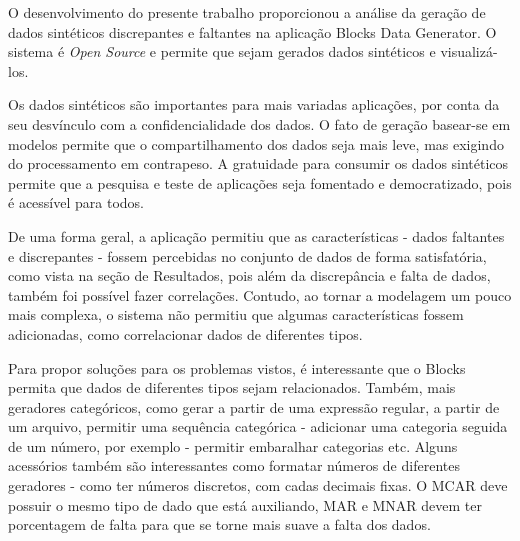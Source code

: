 \documentclass[
	12pt,				%
	openright,			%
	twoside,			%
	a4paper,			%
	english,			%
	brazil				%
	]{abntex2}
\begin{document}
O desenvolvimento do presente trabalho proporcionou a análise da geração de dados sintéticos discrepantes e faltantes na aplicação Blocks Data Generator.
O sistema é \emph{Open Source} e permite que sejam gerados dados sintéticos e visualizá-los.
\par
Os dados sintéticos são importantes para mais variadas aplicações, por conta da seu desvínculo com a confidencialidade dos dados.
O fato de geração basear-se em modelos permite que o compartilhamento dos dados seja mais leve, mas exigindo do processamento em contrapeso.
A gratuidade para consumir os dados sintéticos permite que a pesquisa e teste de aplicações seja fomentado e democratizado, pois é acessível para todos.
\par
De uma forma geral, a aplicação permitiu que as características - dados faltantes e discrepantes - fossem percebidas no conjunto de dados de forma satisfatória, como vista na seção de Resultados, pois além da discrepância e falta de dados, também foi possível fazer correlações.
Contudo, ao tornar a modelagem um pouco mais complexa, o sistema não permitiu que algumas características fossem adicionadas, como correlacionar dados de diferentes tipos.
\par
Para propor soluções para os problemas vistos, é interessante que o Blocks permita que dados de diferentes tipos sejam relacionados.
Também, mais geradores categóricos, como gerar a partir de uma expressão regular, a partir de um arquivo, permitir uma sequência categórica - adicionar uma categoria seguida de um número, por exemplo - permitir embaralhar categorias etc.
Alguns acessórios também são interessantes como formatar números de diferentes geradores - como ter números discretos, com cadas decimais fixas.
O MCAR deve possuir o mesmo tipo de dado que está auxiliando, MAR e MNAR devem ter porcentagem de falta para que se torne mais suave a falta dos dados.
\par

\lipsum[31-33]

\postextual


\end{document}
